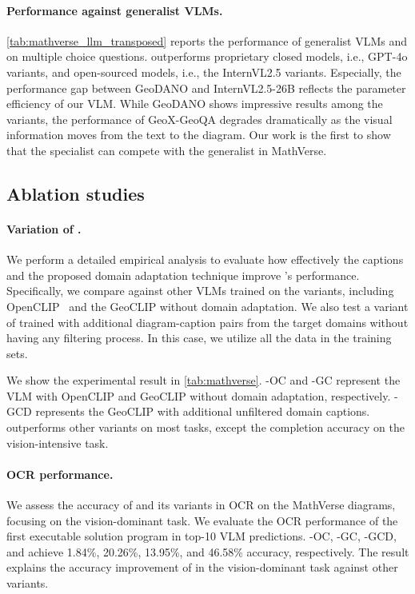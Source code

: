 
\paragraph{Performance against generalist VLMs.}
\cref{tab:mathverse_llm_transposed} reports the performance of generalist VLMs and \geovlm{} on multiple choice questions. \geovlm{} outperforms proprietary closed models, i.e., GPT-4o variants, and open-sourced models, i.e., the InternVL2.5 variants. %
Especially, the performance gap between GeoDANO and InternVL2.5-26B reflects the parameter efficiency of our VLM.
While GeoDANO shows impressive results among the variants, the performance of GeoX-GeoQA degrades dramatically as the visual information moves from the text to the diagram.
Our work is the first to show that the specialist can compete with the generalist in MathVerse.


\subsection{Ablation studies}
\label{sec:abl}

\paragraph{Variation of \geoclip{}.}
We perform a detailed empirical analysis to evaluate how effectively the \captionstyle{} captions and the proposed domain adaptation technique improve \geovlm{}’s performance. Specifically, we compare \geovlm{} against other VLMs trained on the \geoclip{} variants, including OpenCLIP~\citep{clip} and the GeoCLIP without domain adaptation.
We also test a variant of \geoclip{} trained with additional diagram-caption pairs from the target domains without having any filtering process. In this case, we utilize all the data in the training sets.

We show the experimental result in \cref{tab:mathverse}. 
\geovlm{}-OC and \geovlm{}-GC represent the VLM with OpenCLIP and GeoCLIP without domain adaptation, respectively. \geovlm{}-GCD represents the GeoCLIP with additional unfiltered domain captions. \geovlm{} outperforms other variants on most tasks, except the completion accuracy on the vision-intensive task.

\paragraph{OCR performance.}
We assess the accuracy of \geovlm{} and its variants in OCR on the MathVerse diagrams, focusing on the vision-dominant task. We evaluate the OCR performance of the first executable solution program in top-10 VLM predictions. \geovlm{}-OC, \geovlm{}-GC, \geovlm{}-GCD, and \geovlm{} achieve 1.84\%, 20.26\%, 13.95\%, and 46.58\% accuracy, respectively.
The result explains the accuracy improvement of \geovlm{} in the vision-dominant task against other variants.

